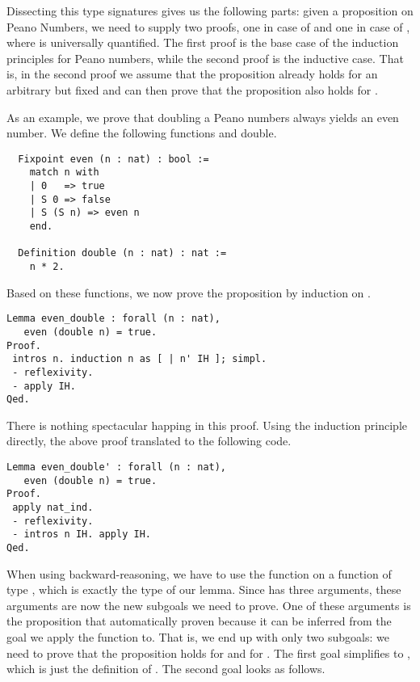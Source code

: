 Dissecting this type signatures gives us the following parts: given a
proposition  on Peano Numbers, we need to supply two proofs,
one in case of  and one in case of , where 
is universally quantified.
The first proof is the base case of the induction principles for Peano
numbers, while the second proof is the inductive case.
That is, in the second proof we assume that the proposition already
holds for an arbitrary but fixed  and can then prove that the
proposition also holds for .

As an example, we prove that doubling a Peano numbers always yields an
even number.
We define the following functions  and {double}.

\begin{verbatim}
  Fixpoint even (n : nat) : bool :=
    match n with
    | 0   => true
    | S 0 => false
    | S (S n) => even n
    end.

  Definition double (n : nat) : nat :=
    n * 2.
\end{verbatim}

 Based on these functions, we now prove the proposition by induction
 on .

\begin{verbatim}
Lemma even_double : forall (n : nat),
   even (double n) = true.
Proof.
 intros n. induction n as [ | n' IH ]; simpl.
 - reflexivity.
 - apply IH.
Qed.
\end{verbatim}

There is nothing spectacular happing in this proof.
Using the induction principle directly, the above proof translated to
the following code.

\begin{verbatim}
Lemma even_double' : forall (n : nat),
   even (double n) = true.
Proof.
 apply nat_ind.
 - reflexivity.
 - intros n IH. apply IH.
Qed.
\end{verbatim}

When using backward-reasoning, we have to use the function
 on a function of type , which is
exactly the type of our lemma.
Since  has three arguments, these arguments are now the
new subgoals we need to prove.
One of these arguments is the proposition  that automatically
proven because it can be inferred from the goal we apply the function
to.
That is, we end up with only two subgoals: we need to prove that the
proposition holds for  and for .
The first goal simplifies to , which is just the
definition of .
The second goal looks as follows.

